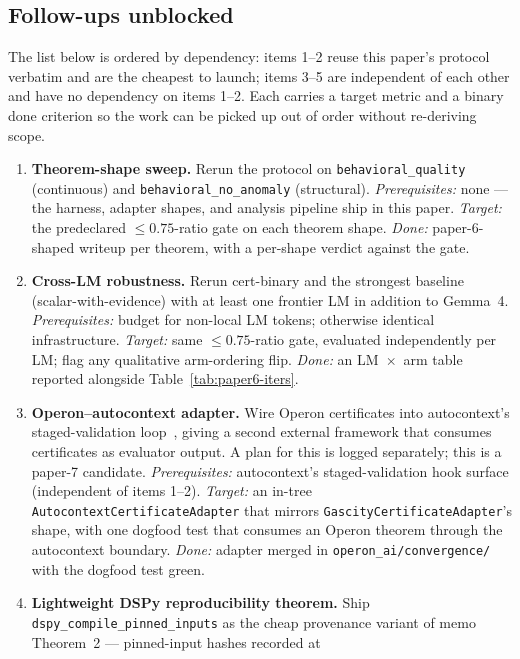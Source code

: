 \subsection{Follow-ups unblocked}\label{sec:followups}

The list below is ordered by dependency: items 1--2 reuse this
paper's protocol verbatim and are the cheapest to launch; items
3--5 are independent of each other and have no dependency on items
1--2.  Each carries a target metric and a binary done criterion so
the work can be picked up out of order without re-deriving scope.

\begin{enumerate}[leftmargin=*,itemsep=2pt,topsep=2pt]
\item \textbf{Theorem-shape sweep.}  Rerun the protocol on
\texttt{behavioral\_quality} (continuous) and
\texttt{behavioral\_no\_anomaly} (structural).
\emph{Prerequisites:} none --- the harness, adapter shapes, and
analysis pipeline ship in this paper.
\emph{Target:} the predeclared $\le 0.75$-ratio gate on each
theorem shape.
\emph{Done:} paper-6-shaped writeup per theorem, with a
per-shape verdict against the gate.
\item \textbf{Cross-LM robustness.}  Rerun cert-binary and the
strongest baseline (scalar-with-evidence) with at least one
frontier LM in addition to Gemma~4.
\emph{Prerequisites:} budget for non-local LM tokens; otherwise
identical infrastructure.
\emph{Target:} same $\le 0.75$-ratio gate, evaluated independently
per LM; flag any qualitative arm-ordering flip.
\emph{Done:} an LM~$\times$~arm table reported alongside
Table~\ref{tab:paper6-iters}.
\item \textbf{Operon--autocontext adapter.}  Wire Operon certificates
into autocontext's staged-validation loop~\cite{autocontext2025},
giving a second external framework that consumes certificates as
evaluator output.  A plan for this is logged separately; this is a
paper-7 candidate.
\emph{Prerequisites:} autocontext's staged-validation hook
surface (independent of items 1--2).
\emph{Target:} an in-tree
\texttt{AutocontextCertificateAdapter} that mirrors
\texttt{GascityCertificateAdapter}'s shape, with one dogfood
test that consumes an Operon theorem through the autocontext
boundary.
\emph{Done:} adapter merged in
\texttt{operon\_ai/convergence/} with the dogfood test green.
\item \textbf{Lightweight DSPy reproducibility theorem.}  Ship
\texttt{dspy\_compile\_pinned\_inputs} as the cheap provenance
variant of memo Theorem~2 --- pinned-input hashes recorded at

\end{enumerate}
